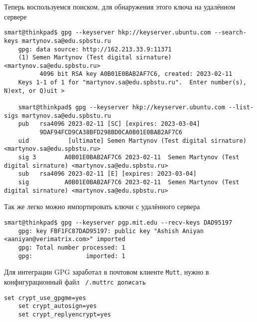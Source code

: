 Теперь воспользуемся поиском, для обнаружения этого ключа на удалённом сервере
\begin{Verbatim}[frame=single]
    smart@thinkpad$ gpg --keyserver hkp://keyserver.ubuntu.com --search-keys martynov.sa@edu.spbstu.ru
    gpg: data source: http://162.213.33.9:11371
    (1)	Semen Martynov (Test digital sirnature) <martynov.sa@edu.spbstu.ru>
    	  4096 bit RSA key A0B01E0BAB2AF7C6, created: 2023-02-11
    Keys 1-1 of 1 for "martynov.sa@edu.spbstu.ru".  Enter number(s), N)ext, or Q)uit >

    smart@thinkpad$ gpg --keyserver hkp://keyserver.ubuntu.com --list-sigs martynov.sa@edu.spbstu.ru
    pub   rsa4096 2023-02-11 [SC] [expires: 2023-03-04]
          9DAF94FCD9CA38BFD298BD0CA0B01E0BAB2AF7C6
    uid           [ultimate] Semen Martynov (Test digital sirnature) <martynov.sa@edu.spbstu.ru>
    sig 3        A0B01E0BAB2AF7C6 2023-02-11  Semen Martynov (Test digital sirnature) <martynov.sa@edu.spbstu.ru>
    sub   rsa4096 2023-02-11 [E] [expires: 2023-03-04]
    sig          A0B01E0BAB2AF7C6 2023-02-11  Semen Martynov (Test digital sirnature) <martynov.sa@edu.spbstu.ru>
\end{Verbatim}

Так же легко можно импортировать ключи с удалённого сервера
\begin{Verbatim}[frame=single]
    smart@thinkpad$ gpg --keyserver pgp.mit.edu --recv-keys DAD95197
    gpg: key FBF1FC87DAD95197: public key "Ashish Aniyan <aaniyan@verimatrix.com>" imported
    gpg: Total number processed: 1
    gpg:               imported: 1
\end{Verbatim}

Для интеграции GPG заработал в почтовом клиенте \texttt{Mutt}, нужно в конфигурационный файл \texttt{~/.muttrc дописать}
\begin{Verbatim}[frame=single]
    set crypt_use_gpgme=yes
    set crypt_autosign=yes
    set crypt_replyencrypt=yes
\end{Verbatim}
